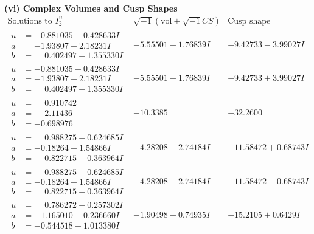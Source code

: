 \documentclass[1p]{elsarticle_modified}
\theoremstyle{definition}
\newcommand{\I}{\sqrt{-1}}
\begin{document}
\newpage\flushleft \textbf{(vi) Complex Volumes and Cusp Shapes}
$$\begin{array}{c|c|c}  
\text{Solutions to }I^u_{2}& \I (\text{vol} + \sqrt{-1}CS) & \text{Cusp shape}\\
 \hline 
\begin{aligned}
u &= -0.881035 + 0.428633 I \\
a &= -1.93807 - 2.18231 I \\
b &= \phantom{-}0.402497 - 1.355330 I\end{aligned}
 & -5.55501 + 1.76839 I & -9.42733 - 3.99027 I \\ \hline\begin{aligned}
u &= -0.881035 - 0.428633 I \\
a &= -1.93807 + 2.18231 I \\
b &= \phantom{-}0.402497 + 1.355330 I\end{aligned}
 & -5.55501 - 1.76839 I & -9.42733 + 3.99027 I \\ \hline\begin{aligned}
u &= \phantom{-}0.910742\phantom{ +0.000000I} \\
a &= \phantom{-}2.11436\phantom{ +0.000000I} \\
b &= -0.698976\phantom{ +0.000000I}\end{aligned}
 & -10.3385\phantom{ +0.000000I} & -32.2600\phantom{ +0.000000I} \\ \hline\begin{aligned}
u &= \phantom{-}0.988275 + 0.624685 I \\
a &= -0.18264 + 1.54866 I \\
b &= \phantom{-}0.822715 + 0.363964 I\end{aligned}
 & -4.28208 - 2.74184 I & -11.58472 + 0.68743 I \\ \hline\begin{aligned}
u &= \phantom{-}0.988275 - 0.624685 I \\
a &= -0.18264 - 1.54866 I \\
b &= \phantom{-}0.822715 - 0.363964 I\end{aligned}
 & -4.28208 + 2.74184 I & -11.58472 - 0.68743 I \\ \hline\begin{aligned}
u &= \phantom{-}0.786272 + 0.257302 I \\
a &= -1.165010 + 0.236660 I \\
b &= -0.544518 + 1.013380 I\end{aligned}
 & -1.90498 - 0.74935 I & -15.2105 + 0.6429 I \\ \hline\begin{aligned}

\end{aligned}
\end{array}$$
\end{document}
